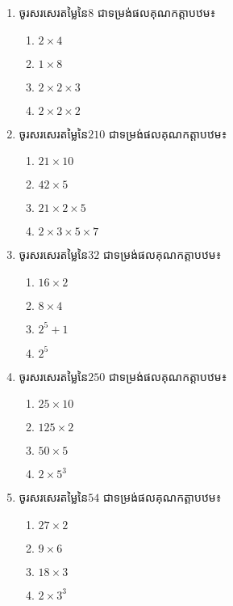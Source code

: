 \begin{enumerate}
\item ចូរសរសេរតម្លៃនៃ$8$ ជាទម្រង់ផលគុណកត្តាបឋម៖
\begin{multicols}{4}
\begin{enumerate}[label=\alph*.]
	\item $2\times 4$
	\item $1\times 8$
	\item $2\times 2\times 3$
	\item $2\times 2\times 2$
\end{enumerate}
\end{multicols}

\item ចូរសរសេរតម្លៃនៃ$210$ ជាទម្រង់ផលគុណកត្តាបឋម៖
\begin{multicols}{4}
\begin{enumerate}[label=\alph*.]
	\item $21\times 10$
	\item $42 \times 5$
	\item $21\times 2\times 5$
	\item $2\times 3\times 5\times 7$
\end{enumerate}
\end{multicols}

\item ចូរសរសេរតម្លៃនៃ$32$ ជាទម្រង់ផលគុណកត្តាបឋម៖
\begin{multicols}{4}
\begin{enumerate}[label=\alph*.]
	\item $16\times 2$
	\item $8 \times 4$
	\item $2^5+1$
	\item $2^5$
\end{enumerate}
\end{multicols}
\item ចូរសរសេរតម្លៃនៃ$250$ ជាទម្រង់ផលគុណកត្តាបឋម៖
\begin{multicols}{4}
\begin{enumerate}[label=\alph*.]
	\item $25\times 10$
	\item $125\times 2$
	\item $50\times 5$
	\item $2\times 5^3$
\end{enumerate}
\end{multicols}
\item ចូរសរសេរតម្លៃនៃ$54$ ជាទម្រង់ផលគុណកត្តាបឋម៖
\begin{multicols}{4}
\begin{enumerate}[label=\alph*.]
	\item $27\times 2$
	\item $9\times 6$
	\item $18\times 3$
	\item $2\times 3^3$
\end{enumerate}
\end{multicols}


\end{enumerate}
